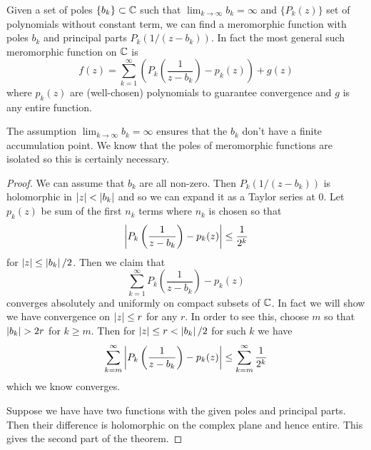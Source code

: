 \begin{theorem}\label{thm:mittag-leffler}
    Given a set of poles $\{b_k\} \subset \mathbb{C}$ such that $\lim_{k \to \infty} b_k = \infty$ and $\{P_k(z)\}$ set of polynomials without constant term, we can find a meromorphic function with poles $b_k$ and principal parts $P_k(1/(z - b_k))$. In fact the most general such meromorphic function on $\mathbb{C}$ is
    $$f(z) = \sum_{k = 1}^\infty \left( P_k \left( \frac{1}{z - b_k} \right) - p_k(z) \right) + g(z)$$
    where $p_k(z)$ are (well-chosen) polynomials to guarantee convergence and $g$ is any entire function.
\end{theorem}
\begin{remark}
    The assumption $\lim_{k \to \infty} b_k = \infty$ ensures that the $b_k$ don't have a finite accumulation point. We know that the poles of meromorphic functions are isolated so this is certainly necessary.
\end{remark}
\begin{proof}
    We can assume that $b_k$ are all non-zero. Then $P_k(1/(z - b_k))$ is holomorphic in $\left|z\right| < \left|b_k\right|$ and so we can expand it as a Taylor series at 0. Let $p_k(z)$ be sum of the first $n_k$ terms where $n_k$ is chosen so that
    $$\left|P_k \left( \frac{1}{z - b_k} \right) - p_k(z)\right| \leq \frac{1}{2^k}$$
    for $\left|z\right| \leq \left|b_k\right|/2$. Then we claim that 
    $$\sum_{k = 1}^\infty P_k \left( \frac{1}{z - b_k} \right) - p_k(z)$$
    converges absolutely and uniformly on compact subsets of $\mathbb{C}$. In fact we will show we have convergence on $\left|z\right| \leq r$ for any $r$. In order to see this, choose $m$ so that $\left|b_k\right| > 2r$ for $k \geq m$. Then for $\left|z\right| \leq r < \left|b_k\right|/2$ for such $k$ we have 
    $$\sum_{k = m}^\infty \left|P_k \left( \frac{1}{z - b_k} \right) - p_k(z)\right| \leq \sum_{k = m}^\infty \frac{1}{2^k}$$
    which we know converges. 

    Suppose we have have two functions with the given poles and principal parts. Then their difference is holomorphic on the complex plane and hence entire. This gives the second part of the theorem.
\end{proof}

